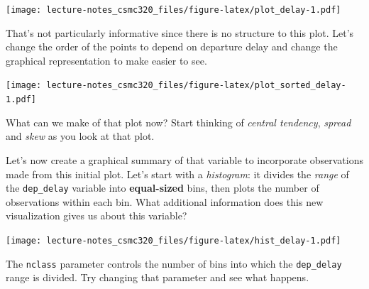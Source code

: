 \documentclass[12pt,]{book}
\newenvironment{Shaded}{\begin{snugshade}}{\end{snugshade}}
\newcommand{\KeywordTok}[1]{\textcolor[rgb]{0.13,0.29,0.53}{\textbf{#1}}}
\newcommand{\DataTypeTok}[1]{\textcolor[rgb]{0.13,0.29,0.53}{#1}}
\newcommand{\StringTok}[1]{\textcolor[rgb]{0.31,0.60,0.02}{#1}}
\newcommand{\OperatorTok}[1]{\textcolor[rgb]{0.81,0.36,0.00}{\textbf{#1}}}
\newcommand{\NormalTok}[1]{#1}
\theoremstyle{definition}
\theoremstyle{definition}
\theoremstyle{definition}
\theoremstyle{remark}
\begin{document}
\begin{Shaded}
\end{Shaded}

\texttt{[image: lecture-notes\_csmc320\_files/figure-latex/plot\_delay-1.pdf]}

That's not particularly informative since there is no structure to this
plot. Let's change the order of the points to depend on departure delay
and change the graphical representation to make easier to see.

\begin{Shaded}
\end{Shaded}

\texttt{[image: lecture-notes\_csmc320\_files/figure-latex/plot\_sorted\_delay-1.pdf]}

What can we make of that plot now? Start thinking of \emph{central
tendency}, \emph{spread} and \emph{skew} as you look at that plot.

Let's now create a graphical summary of that variable to incorporate
observations made from this initial plot. Let's start with a
\emph{histogram}: it divides the \emph{range} of the \texttt{dep\_delay}
variable into \textbf{equal-sized} bins, then plots the number of
observations within each bin. What additional information does this new
visualization gives us about this variable?

\begin{Shaded}
\end{Shaded}

\texttt{[image: lecture-notes\_csmc320\_files/figure-latex/hist\_delay-1.pdf]}

The \texttt{nclass} parameter controls the number of bins into which the
\texttt{dep\_delay} range is divided. Try changing that parameter and
see what happens.
\end{document}
